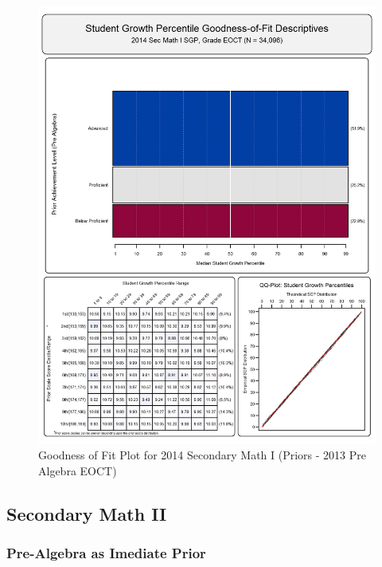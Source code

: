 \documentclass[12pt]{article}
\begin{document}
\begin{figure}[htbp]
\centering
\includegraphics{../img/Goodness_of_Fit/SEC_MATH_I.2014/2014_SEC_MATH_I_EOCT;2013_PRE_ALGEBRA_EOCT.png}
\caption{Goodness of Fit Plot for 2014 Secondary Math I (Priors - 2013
Pre Algebra EOCT)}
\end{figure}

\clearpage 

\subsection{Secondary Math II}\label{secondary-math-ii}

\subsubsection{Pre-Algebra as Imediate
Prior}\label{pre-algebra-as-imediate-prior}
\end{document}
